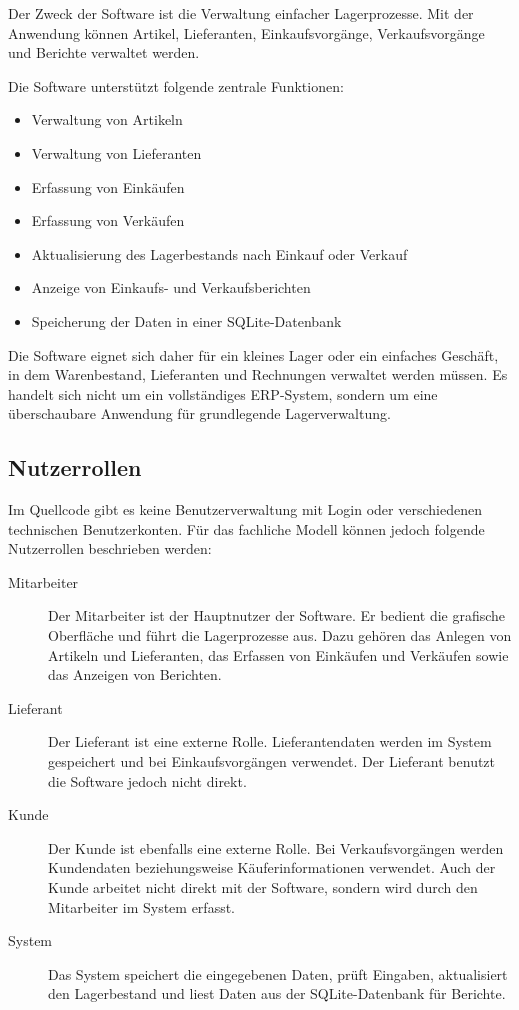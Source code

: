 \documentclass[12pt,a4paper]{article}
\begin{document}
	Der Zweck der Software ist die Verwaltung einfacher Lagerprozesse. Mit der
	Anwendung können Artikel, Lieferanten, Einkaufsvorgänge, Verkaufsvorgänge und
	Berichte verwaltet werden.
	
	Die Software unterstützt folgende zentrale Funktionen:
	
	\begin{itemize}
		\item Verwaltung von Artikeln
		\item Verwaltung von Lieferanten
		\item Erfassung von Einkäufen
		\item Erfassung von Verkäufen
		\item Aktualisierung des Lagerbestands nach Einkauf oder Verkauf
		\item Anzeige von Einkaufs- und Verkaufsberichten
		\item Speicherung der Daten in einer SQLite-Datenbank
	\end{itemize}
	
	Die Software eignet sich daher für ein kleines Lager oder ein einfaches
	Geschäft, in dem Warenbestand, Lieferanten und Rechnungen verwaltet werden
	müssen. Es handelt sich nicht um ein vollständiges ERP-System, sondern um eine
	überschaubare Anwendung für grundlegende Lagerverwaltung.
	
	\subsection{Nutzerrollen}
	
	Im Quellcode gibt es keine Benutzerverwaltung mit Login oder verschiedenen
	technischen Benutzerkonten. Für das fachliche Modell können jedoch folgende
	Nutzerrollen beschrieben werden:
	
	\begin{description}
		\item[Mitarbeiter]
		Der Mitarbeiter ist der Hauptnutzer der Software. Er bedient die grafische
		Oberfläche und führt die Lagerprozesse aus. Dazu gehören das Anlegen von
		Artikeln und Lieferanten, das Erfassen von Einkäufen und Verkäufen sowie
		das Anzeigen von Berichten.
		
		\item[Lieferant]
		Der Lieferant ist eine externe Rolle. Lieferantendaten werden im System
		gespeichert und bei Einkaufsvorgängen verwendet. Der Lieferant benutzt die
		Software jedoch nicht direkt.
		
		\item[Kunde]
		Der Kunde ist ebenfalls eine externe Rolle. Bei Verkaufsvorgängen werden
		Kundendaten beziehungsweise Käuferinformationen verwendet. Auch der Kunde
		arbeitet nicht direkt mit der Software, sondern wird durch den Mitarbeiter
		im System erfasst.
		
		\item[System]
		Das System speichert die eingegebenen Daten, prüft Eingaben, aktualisiert
		den Lagerbestand und liest Daten aus der SQLite-Datenbank für Berichte.
	\end{description}
	
\end{document}
